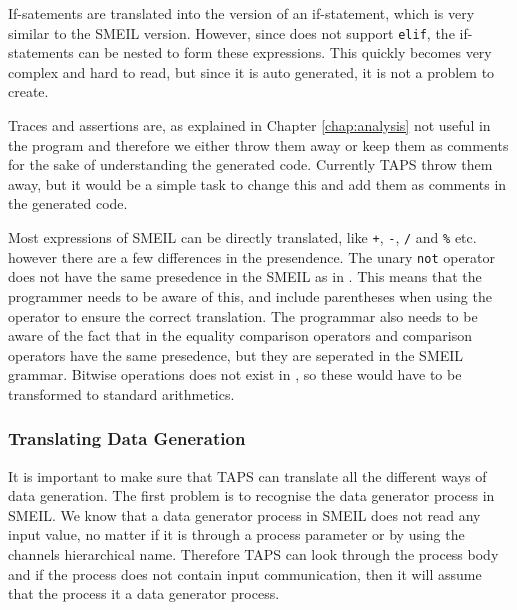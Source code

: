 If-satements are translated into the \cspm{} version of an if-statement, which is very similar to the SMEIL version. However, since \cspm{} does not support \texttt{elif}, the \cspm{} if-statements can be nested to form these expressions. This quickly becomes very complex and hard to read, but since it is auto generated, it is not a problem to create.


Traces and assertions are, as explained in Chapter \ref{chap:analysis} not useful in the \cspm{} program and therefore we either throw them away or keep them as comments for the sake of understanding the generated code. Currently TAPS throw them away, but it would be a simple task to change this and add them as comments in the generated \cspm{} code.

Most expressions of SMEIL can be directly translated, like \texttt{+}, \texttt{-}, \texttt{/} and \texttt{\%} etc. however there are a few differences in the presendence. The unary \texttt{not} operator does not have the same presedence in the SMEIL as in \cspm{}. This means that the programmer needs to be aware of this, and include parentheses when using the operator to ensure the correct translation. The programmar also needs to be aware of the fact that in \cspm{} the equality comparison operators and comparison operators have the same presedence, but they are seperated in the SMEIL grammar.
Bitwise operations does not exist in \cspm{}, so these would have to be transformed to standard arithmetics. %

\subsubsection{Translating Data Generation}
It is important to make sure that TAPS can translate all the different ways of data generation. The first problem is to recognise the data generator process in SMEIL. We know that a data generator process in SMEIL does not read any input value, no matter if it is through a process parameter or by using the channels hierarchical name. Therefore TAPS can look through the process body and if the process does not contain input communication, then it will assume that the process it a data generator process. \\

